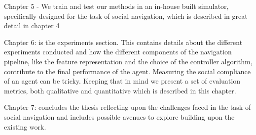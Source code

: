 Chapter 5 - We train and test our methods in an in-house built simulator, specifically designed for the task of social navigation, which is described in great detail in chapter 4

Chapter 6: is the experiments section. This contains details about the different experiments conducted and how the different components of the navigation pipeline, like the feature representation and the choice of the controller algorithm, contribute to the final performance of the agent. Measuring the social compliance of an agent can be tricky. Keeping that in mind we present a set of evaluation metrics, both qualitative and quantitative which is described in this chapter.

Chapter 7: concludes the thesis reflecting upon the challenges faced in the task of social navigation and includes possible avenues to explore building upon the existing work.
